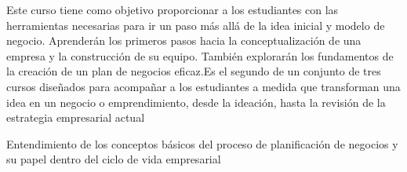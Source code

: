 \begin{syllabus}


\begin{justification}
Este curso tiene como objetivo proporcionar a los estudiantes con las herramientas necesarias para ir un paso más allá de la idea inicial y modelo de negocio. Aprenderán los primeros pasos hacia la conceptualización de una empresa y la construcción de su equipo. También explorarán los fundamentos de la creación de un plan de negocios
eficaz.Es el segundo de un conjunto de tres cursos diseñados para acompañar a los estudiantes a medida que transforman una idea en un negocio o emprendimiento, desde la ideación, hasta la revisión de la estrategia empresarial actual
\end{justification}

\begin{goals}
\item Entendimiento de  los conceptos básicos del proceso de planificación de negocios y su papel dentro del ciclo de vida empresarial
\end{goals}

\begin{outcomes}
   \item {}
   \item {}
   \item {}
\end{outcomes}

\begin{competences}
    \item {}
    \item {}
    \item {}
\end{competences}


\end{syllabus}
